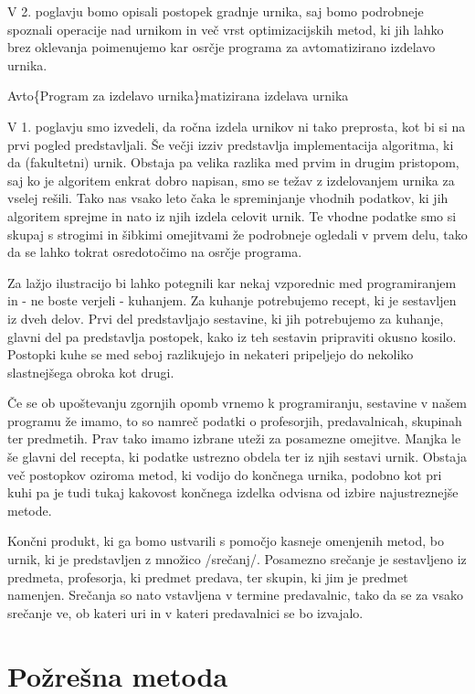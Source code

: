 \documentclass[a4paper,10pt]{article}
\begin{document}
V 2. poglavju bomo opisali postopek gradnje urnika, saj bomo podrobneje spoznali
operacije nad urnikom in več vrst optimizacijskih metod, ki jih lahko brez oklevanja
poimenujemo kar osrčje programa za avtomatizirano izdelavo urnika.

Avto\{Program za izdelavo urnika\}matizirana izdelava urnika 

V 1. poglavju smo izvedeli, da ročna izdela urnikov ni tako preprosta, kot bi si
na prvi pogled predstavljali. Še večji izziv predstavlja implementacija algoritma, ki da
(fakultetni) urnik. Obstaja pa velika razlika med prvim in drugim pristopom, saj ko je
algoritem enkrat dobro napisan, smo se težav z izdelovanjem urnika za vselej rešili.
Tako nas vsako leto čaka le spreminjanje vhodnih podatkov, ki jih algoritem sprejme in
nato iz njih izdela celovit urnik. Te vhodne podatke smo si skupaj s strogimi in šibkimi
omejitvami že podrobneje ogledali v prvem delu, tako da se lahko tokrat osredotočimo na
osrčje programa.

Za lažjo ilustracijo bi lahko potegnili kar nekaj vzporednic med programiranjem in - ne
boste verjeli - kuhanjem. Za kuhanje potrebujemo recept, ki je sestavljen iz dveh delov.
Prvi del predstavljajo sestavine, ki jih potrebujemo za kuhanje, glavni del pa predstavlja
postopek, kako iz teh sestavin pripraviti okusno kosilo. Postopki kuhe se med seboj
razlikujejo in nekateri pripeljejo do nekoliko slastnejšega obroka kot drugi.

Če se ob upoštevanju zgornjih opomb vrnemo k programiranju, sestavine v našem programu že
imamo, to so namreč podatki o profesorjih, predavalnicah, skupinah ter predmetih. Prav tako
imamo izbrane uteži za posamezne omejitve. Manjka le še glavni del recepta, ki podatke
ustrezno obdela ter iz njih sestavi urnik. Obstaja več postopkov oziroma metod, ki vodijo
do končnega urnika, podobno kot pri kuhi pa je tudi tukaj kakovost končnega izdelka odvisna
od izbire najustreznejše metode.

Končni produkt, ki ga bomo ustvarili s pomočjo kasneje omenjenih metod, bo urnik, ki je
predstavljen z množico /srečanj/. Posamezno srečanje je sestavljeno iz predmeta,
profesorja, ki predmet predava, ter skupin, ki jim je predmet namenjen. Srečanja so nato
vstavljena v termine predavalnic, tako da se za vsako srečanje ve, ob kateri uri in v
kateri predavalnici se bo izvajalo.

\section{Požrešna metoda}
\end{document}
